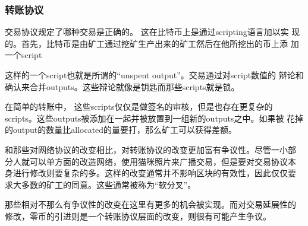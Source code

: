 \documentclass[letterpaper]{article}
\begin{document}
\subsubsection{转账协议}
交易协议规定了哪种交易是正确的。 这在比特币上是通过scripting语言加以实
现的。首先，比特币是由矿工通过挖矿生产出来的矿工然后在他所挖出的币上添
加一个script

这样的一个script也就是所谓的``unspent output''。交易通过对script数值的
辩论和确认来合并outputs。这些辩论就像是钥匙而那些scripts就是锁。

在简单的转账中， 这些scripts仅仅是做签名的审核，但是也存在更复杂的
scripts。这些outputs被添加在一起并被放置到一组新的outputs之中。如果被
花掉的output的数量比allocated的量要打，那么矿工可以获得差额。

和那些对网络协议的改变相比，对转账协议的改变更加富有争议性。尽管一小部
分人就可以单方面的改造网络，使用猫咪照片来广播交易，但是要对交易协议本
身进行修改则要复杂的多。这样的改变通常并不影响区块的有效性，因此仅仅要
求大多数的矿工的同意。这些通常被称为``软分叉''。

那些相对不那么有争议性的改变在这里有更多的机会被实现。而对交易延展性的
修改，零币的引进则是一个转账协议层面的改变，则很有可能产生争议。
\end{document}
